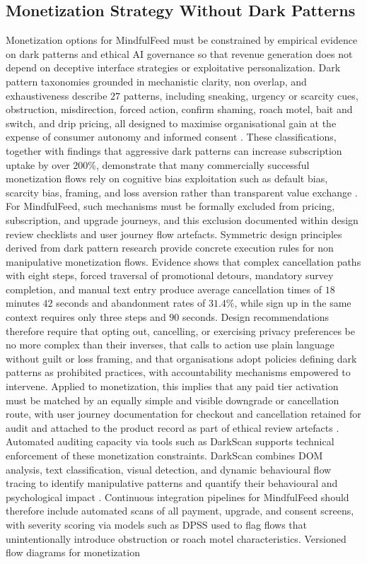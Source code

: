 \documentclass{article}
\begin{document}
\subsection{Monetization Strategy Without Dark Patterns}
\label{sec:monetization_without_dark_patterns} Monetization options for MindfulFeed must be constrained by empirical evidence on dark patterns and ethical AI governance so that revenue generation does not depend on deceptive interface strategies or exploitative personalization. Dark pattern taxonomies grounded in mechanistic clarity, non overlap, and exhaustiveness describe $27$ patterns, including sneaking, urgency or scarcity cues, obstruction, misdirection, forced action, confirm shaming, roach motel, bait and switch, and drip pricing, all designed to maximise organisational gain at the expense of consumer autonomy and informed consent \parencites[2]{5127387}[2]{4807303}. These classifications, together with findings that aggressive dark patterns can increase subscription uptake by over $200\%$, demonstrate that many commercially successful monetization flows rely on cognitive bias exploitation such as default bias, scarcity bias, framing, and loss aversion rather than transparent value exchange \parencites[2]{4807303}[2]{5127387}. For MindfulFeed, such mechanisms must be formally excluded from pricing, subscription, and upgrade journeys, and this exclusion documented within design review checklists and user journey flow artefacts. Symmetric design principles derived from dark pattern research provide concrete execution rules for non manipulative monetization flows. Evidence shows that complex cancellation paths with eight steps, forced traversal of promotional detours, mandatory survey completion, and manual text entry produce average cancellation times of $18$ minutes $42$ seconds and abandonment rates of $31.4\%$, while sign up in the same context requires only three steps and $90$ seconds. Design recommendations therefore require that opting out, cancelling, or exercising privacy preferences be no more complex than their inverses, that calls to action use plain language without guilt or loss framing, and that organisations adopt policies defining dark patterns as prohibited practices, with accountability mechanisms empowered to intervene. Applied to monetization, this implies that any paid tier activation must be matched by an equally simple and visible downgrade or cancellation route, with user journey documentation for checkout and cancellation retained for audit and attached to the product record as part of ethical review artefacts \parencites[8]{4807303}. Automated auditing capacity via tools such as DarkScan supports technical enforcement of these monetization constraints. DarkScan combines DOM analysis, text classification, visual detection, and dynamic behavioural flow tracing to identify manipulative patterns and quantify their behavioural and psychological impact \parencites[2]{4807303}. Continuous integration pipelines for MindfulFeed should therefore include automated scans of all payment, upgrade, and consent screens, with severity scoring via models such as DPSS used to flag flows that unintentionally introduce obstruction or roach motel characteristics. Versioned flow diagrams for monetization 
\end{document}

